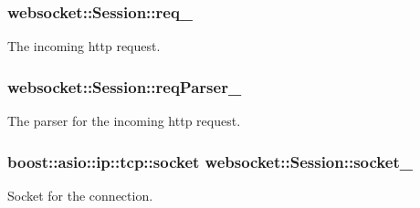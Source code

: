 \subsubsection[{\texorpdfstring{req\+\_\+}{req_}}]{ websocket\+::\+Session\+::req\+\_\+\hspace{0.3cm}{\ttfamily [private]}}\hypertarget{classwebsocket_1_1Session_a80b1e6b3657a3c3528acd3c9b4e453a5}{}\label{classwebsocket_1_1Session_a80b1e6b3657a3c3528acd3c9b4e453a5}


The incoming http request. 

\subsubsection[{\texorpdfstring{req\+Parser\+\_\+}{reqParser_}}]{ websocket\+::\+Session\+::req\+Parser\+\_\+\hspace{0.3cm}{\ttfamily [private]}}\hypertarget{classwebsocket_1_1Session_a0336ca414e7c038331b39a01cdb23da8}{}\label{classwebsocket_1_1Session_a0336ca414e7c038331b39a01cdb23da8}


The parser for the incoming http request. 

\subsubsection[{\texorpdfstring{socket\+\_\+}{socket_}}]{\setlength{\rightskip}{0pt plus 5cm}boost\+::asio\+::ip\+::tcp\+::socket websocket\+::\+Session\+::socket\+\_\+\hspace{0.3cm}{\ttfamily [private]}}\hypertarget{classwebsocket_1_1Session_a7e7771fef3f105f4019ef9a1c2f04eb5}{}\label{classwebsocket_1_1Session_a7e7771fef3f105f4019ef9a1c2f04eb5}


Socket for the connection. 

